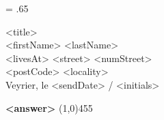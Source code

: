 {
	\leftskip = .65\hsize

	<title> \\
	<firstName> <lastName> \\
	<livesAt> %
	<street> <numStreet> \\
	<postCode> <locality> \\
	\bigbreak
	\bigbreak
	Veyrier, le <sendDate> / <initials>
	\bigbreak
}

\begin{flushleft}
	\textbf{<answer>}
	\line(1,0){455}
\end{flushleft}
\bigbreak